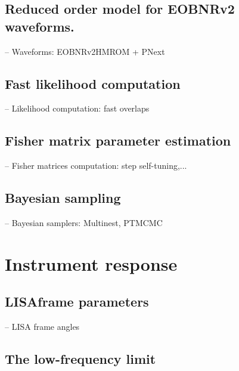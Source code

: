 \documentclass[aps,showpacs,twocolumn,prd,superscriptaddress,nofootinbib]{revtex4}
\begin{document}

\subsection{Reduced order model for EOBNRv2 waveforms.}
\label{sec:waveforms}

-- Waveforms: EOBNRv2HMROM + PNext


\subsection{Fast likelihood computation}
\label{sec:likelihood}

-- Likelihood computation: fast overlaps


\subsection{Fisher matrix parameter estimation}
\label{sec:Fisher}

-- Fisher matrices computation: step self-tuning,...


\subsection{Bayesian sampling}
\label{sec:samplers}

-- Bayesian samplers: Multinest, PTMCMC


\section{Instrument response}
\label{sec:response}


\subsection{LISAframe parameters}
\label{sec:LISAframe}

-- LISA frame angles


\subsection{The low-frequency limit}
\label{sec:low-freq}
\end{document}
